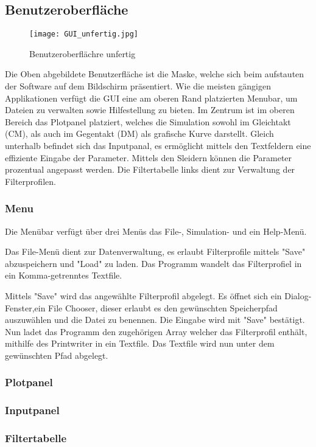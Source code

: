 \subsection{Benutzeroberfläche} \label{subsec:benutzeroberflaeche}

\begin{figure}[H]
		\centering
		\texttt{[image: GUI\_unfertig.jpg]}
		\label{fig:gui}
		\caption{Benutzeroberflächre unfertig}
\end{figure}

Die Oben abgebildete Benutzerfläche ist die Maske, welche sich beim aufstauten der Software auf dem Bildschirm präsentiert.
Wie die  meisten gängigen Applikationen verfügt die GUI eine am oberen Rand platzierten Menubar, um Dateien zu verwalten sowie Hilfestellung zu bieten.
Im Zentrum ist im oberen Bereich das Plotpanel platziert, welches die Simulation sowohl im Gleichtakt (CM), als auch im Gegentakt (DM) als grafische Kurve darstellt.
Gleich unterhalb befindet sich das Inputpanal, es ermöglicht mittels den Textfeldern eine  effiziente Eingabe der  Parameter. Mittels den Sleidern können die Parameter prozentual angepasst werden.
Die Filtertabelle links dient zur Verwaltung der Filterprofilen.


\subsubsection{Menu}\label{subsubsec:menu}

Die Menübar verfügt über drei Menüs das File-,  Simulation- und ein Help-Menü.

Das File-Menü dient zur Datenverwaltung, es erlaubt Filterprofile mittels "Save" abzuspeichern und "Load" zu laden. 
Das Programm wandelt das Filterprofiel in ein Komma-getrenntes Textfile.

Mittels "Save" wird das angewählte Filterprofil abgelegt. Es öffnet sich ein Dialog-Fenster,ein File Chooser, dieser erlaubt es den gewünschten Speicherpfad auszuwählen und die Datei zu benennen. Die Eingabe wird mit "Save" bestätigt. Nun ladet das Programm den zugehörigen Array welcher das Filterprofil enthält, mithilfe des Printwriter in ein Textfile. Das Textfile wird nun unter dem gewünschten Pfad abgelegt.





\subsubsection{Plotpanel} \label{subsubsec:plotpanel}


\subsubsection{Inputpanel} \label{subsubsec:inputpanel}



\subsubsection{Filtertabelle} \label{subsubsec:filtertabelle}

